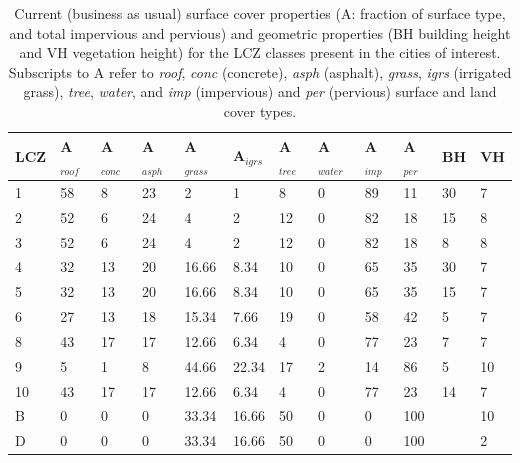 \documentclass[utf8]{frontiersSCNS} %
\begin{document}
\setlength\arrayrulewidth{1.2pt} %
\begin{table}[!ht]
\caption{Current (business as usual) surface cover properties (A: fraction of surface type, and total impervious and pervious) and geometric properties (BH building height and VH vegetation height)  for the LCZ classes present in the cities of interest. Subscripts to A refer to \textit{roof}, \textit{conc} (concrete), \textit{asph} (asphalt), \textit{grass}, \textit{igrs} (irrigated grass), \textit{tree}, \textit{water}, and \textit{imp} (impervious) and \textit{per} (pervious) surface and land cover types.}
    \centering
    \small
    \begin{tabular}{|l|l|l|l|l|l|l|l|l|l|l|l|}
    \hline
       \rowcolor{light-gray} LCZ  & A$_{roof}$  & A$_{conc}$  & A$_{asph}$  & A$_{grass}$  & A$_{igrs}$  & A$_{tree}$  & A$_{water}$  & A$_{imp}$  & A$_{per}$  & BH  & VH  \\ \hline
1 & 58 & 8  & 23 & 2     & 1     & 8  & 0 & 89 & 11  & 30 & 7  \\
2 & 52 & 6  & 24 & 4     & 2     & 12 & 0 & 82 & 18  & 15 & 8  \\
3 & 52 & 6  & 24 & 4     & 2     & 12 & 0 & 82 & 18  & 8  & 8  \\
4 & 32 & 13 & 20 & 16.66 & 8.34  & 10 & 0 & 65 & 35  & 30 & 7  \\
5 & 32 & 13 & 20 & 16.66 & 8.34  & 10 & 0 & 65 & 35  & 15 & 7  \\
6 & 27 & 13 & 18 & 15.34 & 7.66  & 19 & 0 & 58 & 42  & 5  & 7  \\
8 & 43 & 17 & 17 & 12.66 & 6.34  & 4  & 0 & 77 & 23  & 7  & 7  \\
9 & 5  & 1  & 8  & 44.66 & 22.34 & 17 & 2 & 14 & 86  & 5  & 10 \\
10 & 43 & 17 & 17 & 12.66 & 6.34  & 4  & 0 & 77 & 23  & 14 & 7  \\
B & 0  & 0  & 0  & 33.34 & 16.66 & 50 & 0 & 0  & 100 &    & 10 \\
D & 0  & 0  & 0  & 33.34 & 16.66 & 50 & 0 & 0  & 100 &    & 2  \\ \hline 
    \end{tabular}\label{table:bau_lcz_properties}
\end{table}
\setlength\arrayrulewidth{0.4pt} %
\end{document}
